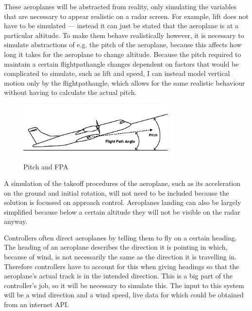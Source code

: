 \documentclass{article}
\begin{document}
These aeroplanes will be abstracted from reality, only simulating the variables that are necessary to appear realistic on a radar screen.
For example, lift does not have to be simulated --- instead it can just be stated that the aeroplane is at a particular altitude.
To make them behave realistically however, it is necessary to simulate abstractions of e.g.
the pitch of the aeroplane, because this affects how long it takes for the aeroplane to change altitude.
Because the pitch required to maintain a certain \gls{flightpathangle} changes dependent on factors that would be complicated to simulate, such as lift and speed, I can instead model vertical motion only by the \gls{flightpathangle}, which allows for the same realistic behaviour without having to calculate the actual pitch.
\begin{figure}[H]
\centering
\includegraphics[width=0.7\textwidth]{diagrams/pitchfpa.png}
\caption{\label{fig:pitchfpa}Pitch and FPA}
\end{figure}
A simulation of the takeoff procedures of the aeroplane, such as its acceleration on the ground and initial rotation, will not need to be included because the solution is focussed on approach control.
Aeroplanes landing can also be largely simplified because below a certain altitude they will not be visible on the radar anyway.

Controllers often direct aeroplanes by telling them to fly on a certain heading.
The heading of an aeroplane describes the direction it is pointing in which, because of wind, is not necessarily the same as the direction it is travelling in.
Therefore controllers have to account for this when giving headings so that the aeroplane's actual track is in the intended direction.
This is a big part of the controller's job, so it will be necessary to simulate this.
The input to this system will be a wind direction and a wind speed, live data for which could be obtained from an internet API.

\newpage
\end{document}
